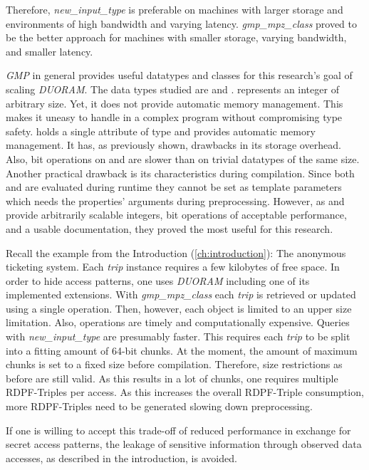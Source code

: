 Therefore, \textit{new\_input\_type} is preferable on machines with larger storage and environments of high bandwidth and varying latency.
\textit{gmp\_mpz\_class} proved to be the better approach for machines with smaller storage, varying bandwidth, and smaller latency.

\textit{GMP} in general provides useful datatypes and classes for this research's goal of scaling \textit{DUORAM}.
The data types studied are  and .
 represents an integer of arbitrary size.
Yet, it does not provide automatic memory management.
This makes it uneasy to handle in a complex program without compromising type safety.
 holds a single attribute of type  and provides automatic memory management.
It has, as previously shown, drawbacks in its storage overhead.
Also, bit operations on  and  are slower than on trivial datatypes of the same size.
Another practical drawback is its characteristics during compilation.
Since both  and  are evaluated during runtime they cannot be set as template parameters which needs the properties' arguments during preprocessing.
However, as  and  provide arbitrarily scalable integers, bit operations of acceptable performance, and a usable documentation, they proved the most useful for this research.

Recall the example from the Introduction (\ref{ch:introduction}): The anonymous ticketing system.
Each \textit{trip} instance requires a few kilobytes of free space.
In order to hide access patterns, one uses \textit{DUORAM} including one of its implemented extensions.
With \textit{gmp\_mpz\_class} each \textit{trip} is retrieved or updated using a single operation.
Then, however, each object is limited to an upper size limitation.
Also, operations are timely and computationally expensive.
Queries with \textit{new\_input\_type} are presumably faster.
This requires each \textit{trip} to be split into a fitting amount of 64-bit chunks.
At the moment, the amount of maximum chunks is set to a fixed size before compilation.
Therefore, size restrictions as before are still valid.
As this results in a lot of chunks, one requires multiple RDPF-Triples per access.
As this increases the overall RDPF-Triple consumption, more RDPF-Triples need to be generated slowing down preprocessing.

If one is willing to accept this trade-off of reduced performance in exchange for secret access patterns, the leakage of sensitive information through observed data accesses, as described in the introduction, is avoided.

